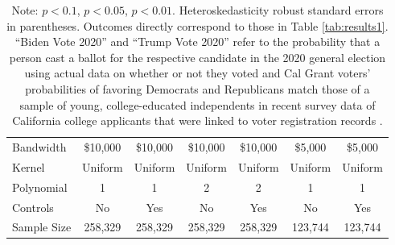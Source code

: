 \documentclass[12pt,letterpaper,oneside]{book}
\begin{document}
\begin{table}[h!]
\begin{tabular}{l*{6}{c}}
        \hline
        Bandwidth & \$10,000       &   \$10,000        &   \$10,000        &   \$10,000       &   \$5,000        &   \$5,000        \\
        Kernel&   Uniform      &   Uniform        &   Uniform        &   Uniform       &   Uniform       &   Uniform       \\
        Polynomial&   1       &   1        &   2        &   2       &   1       &   1       \\
        Controls&   No       &   Yes        &   No        &   Yes        &   No        &   Yes        \\
        Sample Size      &   258,329     &    258,329      &      258,329      &   258,329    &   123,744       &   123,744        \\
        \hline
    \end{tabular}
    \caption*{\footnotesize Note: \sym{+} \(p<0.1\), \sym{*} \(p<0.05\), \sym{**} \(p<0.01\). Heteroskedasticity robust standard errors in parentheses. Outcomes directly correspond to those in Table \ref{tab:results1}. ``Biden Vote 2020'' and ``Trump Vote 2020'' refer to the probability that a person cast a ballot for the respective candidate in the 2020 general election using actual data on whether or not they voted and Cal Grant voters' probabilities of favoring Democrats and Republicans match those of a sample of young, college-educated independents in recent survey data of California college applicants that were linked to voter registration records \citep{firoozi_effect_2023}.}
\end{table}

\clearpage
\end{document}
